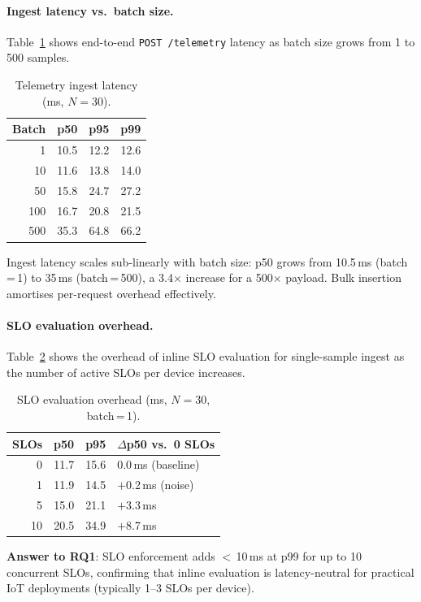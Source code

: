 \documentclass[twocolumn,smallextended]{svjour3}
\begin{document}
\paragraph{Ingest latency vs.\ batch size.}
Table~\ref{tab:ingest} shows end-to-end \texttt{POST /telemetry} latency
as batch size grows from 1 to 500 samples.

\begin{table}[t]
\centering
\caption{Telemetry ingest latency (ms, $N\!=\!30$).}
\label{tab:ingest}
\begin{tabular}{@{}rrrr@{}}
\toprule
Batch & p50 & p95 & p99 \\
\midrule
1   & 10.5 & 12.2 & 12.6 \\
10  & 11.6 & 13.8 & 14.0 \\
50  & 15.8 & 24.7 & 27.2 \\
100 & 16.7 & 20.8 & 21.5 \\
500 & 35.3 & 64.8 & 66.2 \\
\bottomrule
\end{tabular}
\end{table}

Ingest latency scales sub-linearly with batch size: p50 grows from 10.5\,ms
(batch\,=\,1) to 35\,ms (batch\,=\,500), a 3.4$\times$ increase for a
500$\times$ payload. Bulk insertion amortises per-request overhead effectively.

\paragraph{SLO evaluation overhead.}
Table~\ref{tab:slo} shows the overhead of inline SLO evaluation for
single-sample ingest as the number of active SLOs per device increases.

\begin{table}[t]
\centering
\caption{SLO evaluation overhead (ms, $N\!=\!30$, batch\,=\,1).}
\label{tab:slo}
\begin{tabular}{@{}rrrl@{}}
\toprule
SLOs & p50 & p95 & $\Delta$p50 vs.\ 0 SLOs \\
\midrule
0  & 11.7 & 15.6 & 0.0\,ms (baseline) \\
1  & 11.9 & 14.5 & $+$0.2\,ms (noise) \\
5  & 15.0 & 21.1 & $+$3.3\,ms \\
10 & 20.5 & 34.9 & $+$8.7\,ms \\
\bottomrule
\end{tabular}
\end{table}

\textbf{Answer to RQ1}: SLO enforcement adds $<$\,10\,ms at p99 for up to
10 concurrent SLOs, confirming that inline evaluation is latency-neutral
for practical IoT deployments (typically 1--3 SLOs per device).
\end{document}
